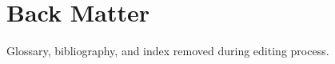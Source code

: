 \documentclass[oneside, openany]{book}
\providecommand\phantomsection{}
\begin{document}
%
%
%

%
%
%
%

\backmatter
\pagestyle{plain}

\chapter{Back Matter}

Glossary, bibliography, and index removed during editing process.

%
%
%
%

\clearpage

\immediate\closeout\outputstream
\end{document}
